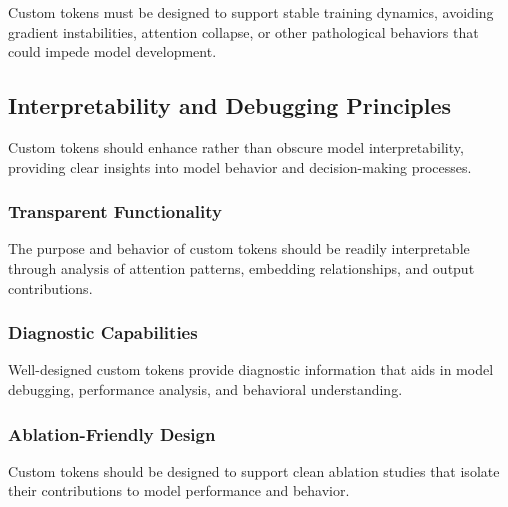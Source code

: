 Custom tokens must be designed to support stable training dynamics, avoiding gradient instabilities, attention collapse, or other pathological behaviors that could impede model development.

\subsection{Interpretability and Debugging Principles}

Custom tokens should enhance rather than obscure model interpretability, providing clear insights into model behavior and decision-making processes.

\subsubsection{Transparent Functionality}

The purpose and behavior of custom tokens should be readily interpretable through analysis of attention patterns, embedding relationships, and output contributions.

\subsubsection{Diagnostic Capabilities}

Well-designed custom tokens provide diagnostic information that aids in model debugging, performance analysis, and behavioral understanding.

\subsubsection{Ablation-Friendly Design}

Custom tokens should be designed to support clean ablation studies that isolate their contributions to model performance and behavior.